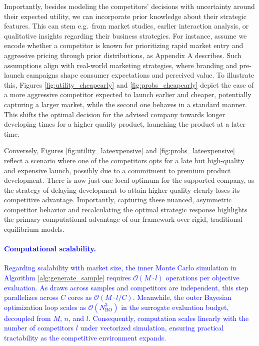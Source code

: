 \documentclass[a4paper,fleqn, 11pt]{cas-sc}
\begin{document}
 Importantly, besides modeling the competitors' decisions with uncertainty 
  around their expected utility, we can incorporate prior knowledge about their strategic features. 
  This can stem e.g.\ from market studies, earlier interaction analysis, or qualitative insights regarding their business strategies. For instance, assume we encode whether a competitor is known for prioritizing rapid market entry and aggressive pricing
   through 
  prior distributions, as Appendix A describes. Such assumptions align with real-world marketing strategies, where branding and pre-launch campaigns shape consumer expectations and perceived value. To illustrate this, Figures \ref{fig:utility_cheapearly} and \ref{fig:probs_cheapearly} depict the case of a more aggressive 
   competitor expected to launch earlier and cheaper, potentially capturing a larger market, while the second one behaves in a standard manner. This shifts the optimal decision for the advised company towards longer developing times for a higher quality product, launching the product at a later time.
   
Conversely, Figures \ref{fig:utility_lateexpensive} and \ref{fig:probs_lateexpensive} reflect a scenario where one of the 
 competitors opts for a late but high-quality and expensive launch, possibly due to a commitment to premium product development. 
  There is now just one local optimum for the supported company, as the strategy of delaying development to attain higher quality clearly loses its competitive advantage. Importantly, capturing these nuanced, asymmetric competitor behavior and recalculating the optimal strategic response highlights the primary computational advantage of our framework over rigid, traditional equilibrium models.

\paragraph{\textcolor{blue}{Computational scalability.}}
\textcolor{blue}{Regarding scalability with market size, the inner Monte Carlo simulation in Algorithm \ref{alg:generate_sample} requires $\mathcal{O}(M \cdot l)$ operations per objective evaluation. As draws across samples and competitors are independent, this step parallelizes across $C$ cores as $\mathcal{O}(M \cdot l / C)$. Meanwhile, the outer Bayesian optimization loop scales as $\mathcal{O}(N_{\text{BO}}^3)$ in the surrogate evaluation budget, decoupled from $M$, $n$, and $l$. Consequently, computation scales linearly with the number of competitors $l$ under vectorized simulation, ensuring practical tractability as the competitive environment expands.}
\end{document}
